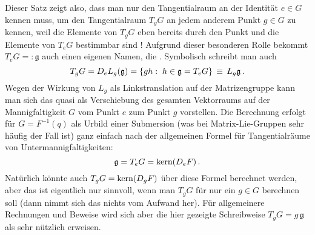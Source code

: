 \documentclass[../H_Analysis_main.tex]{subfiles}
\begin{document}

Dieser Satz zeigt also, dass man nur den Tangentialraum an der Identität $e \in G$ kennen muss, um den Tangentialraum $T_g G$ an jedem anderem Punkt $g \in G$ zu kennen, weil die Elemente von $T_g G$ eben bereits durch den Punkt und die Elemente von $T_e G$ bestimmbar sind ! Aufgrund dieser besonderen Rolle bekommt $T_e G =: \mathfrak{g}$ auch einen eigenen Namen, die . Symbolisch schreibt man auch
\begin{equation}
T_g G = D_e L_g (\mathfrak{g}) = \qty{gh: \; h \in \mathfrak{g} = T_e G} \, \equiv \, L_g \mathfrak{g} \, .
\end{equation}
Wegen der Wirkung von $L_g$ als Linkstranslation auf der Matrizengruppe kann man sich das quasi als Verschiebung des gesamten Vektorraums auf der Mannigfaltigkeit $G$ vom Punkt $e$ zum Punkt $g$ vorstellen. Die Berechnung erfolgt für $G = F^{-1}(q)$ als Urbild einer Submersion (was bei Matrix-Lie-Gruppen sehr häufig der Fall ist) ganz einfach nach der allgemeinen Formel für Tangentialräume von Untermannigfaltigkeiten:
\begin{equation}
\mathfrak{g} = T_e G = \text{kern}\qty(D_e F) \, .
\end{equation}
Natürlich könnte auch $T_g G = \text{kern}\qty(D_g F)$ über diese Formel berechnet werden, aber das ist eigentlich nur sinnvoll, wenn man $T_g G$ für nur ein $g \in G$ berechnen soll (dann nimmt sich das nichts vom Aufwand her). Für allgemeinere Rechnungen und Beweise wird sich aber die hier gezeigte Schreibweise $T_g G = g \, \mathfrak{g}$ als sehr nützlich erweisen.

\end{document}
